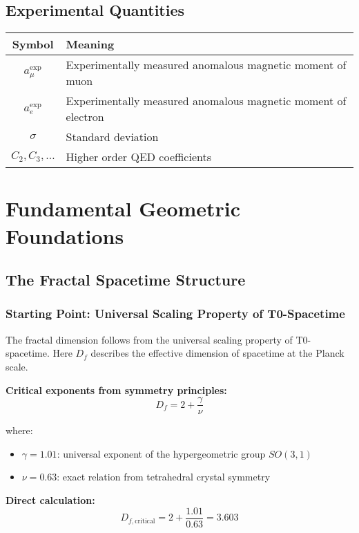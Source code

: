 \documentclass[12pt,a4paper]{article}
\numberwithin{equation}{section}
\newcommand{\Df}{D_f}
\newcommand{\Dfcritical}{D_{f,\text{critical}}}
\begin{document}
	\subsection{Experimental Quantities}
	
	\begin{longtable}{cl}
		\toprule
		\textbf{Symbol} & \textbf{Meaning} \\
		\midrule
		$a_\mu^{\exp}$ & Experimentally measured anomalous magnetic moment of muon \\
		$a_e^{\exp}$ & Experimentally measured anomalous magnetic moment of electron \\
		$\sigma$ & Standard deviation \\
		$C_2, C_3, \ldots$ & Higher order QED coefficients \\
		\bottomrule
	\end{longtable}
	
	\section{Fundamental Geometric Foundations}
	
	\subsection{The Fractal Spacetime Structure}
	
	\subsubsection{Starting Point: Universal Scaling Property of T0-Spacetime}
	
	The fractal dimension follows from the universal scaling property of T0-spacetime. Here $\Df$ describes the effective dimension of spacetime at the Planck scale.
	
	\textbf{Critical exponents from symmetry principles:}
	\begin{equation}
		\Df = 2 + \frac{\gamma}{\nu}
		\label{eq:fractal_dimension}
	\end{equation}
	
	where:
	\begin{itemize}
		\item $\gamma = 1.01$: universal exponent of the hypergeometric group $SO(3,1)$
		\item $\nu = 0.63$: exact relation from tetrahedral crystal symmetry
	\end{itemize}
	
	\textbf{Direct calculation:}
	\begin{equation}
		\Dfcritical = 2 + \frac{1.01}{0.63} = 3.603
		\label{eq:df_critical}
	\end{equation}
	
\end{document}
